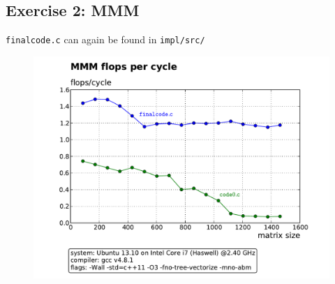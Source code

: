 \documentclass[11pt]{article}
\begin{document}
\subsection*{Exercise 2: MMM}
	\texttt{finalcode.c} can again be found in \texttt{impl/src/}
	\begin{figure}[H]\centering
		\includegraphics[width = 6in]{performance.pdf}
	\end{figure}
\end{document}
